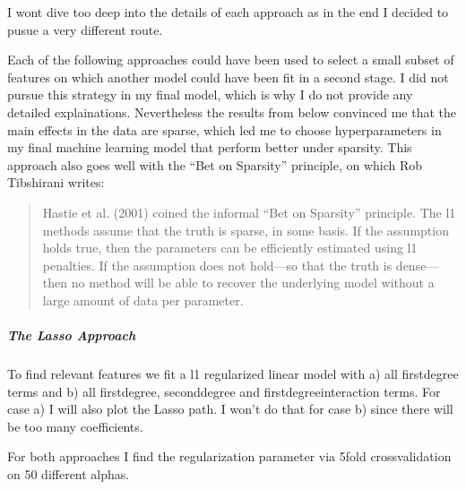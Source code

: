 \documentclass[letterpaper,10pt,english]{sphinxmanual}
\begin{document}
I wont dive too deep into the details of each approach as in the end I decided to pusue a very different route.

Each of the following approaches could have been used to select a small subset of features on which another model could have been fit in a second stage. I did not pursue this strategy in my final model, which is why I do not provide any detailed explainations. Nevertheless the results from below convinced me that the main effects in the data are sparse, which led me to choose hyperparameters in my final machine learning model that perform better under sparsity. This approach also goes well with the “Bet on Sparsity” principle, on which Rob Tibshirani writes:
\begin{quote}

Hastie et al. (2001) coined the informal “Bet on Sparsity” principle. The l1 methods assume that the truth is sparse, in some basis. If the assumption holds true, then the parameters can be efficiently estimated using l1 penalties. If the assumption does not hold—so that the truth is dense—then no method will be able to recover the underlying model without a large amount of data per parameter.
\end{quote}


\subparagraph{The Lasso Approach}
\label{\detokenize{simulated_reverse_engineering:the-lasso-approach}}
To find relevant features we fit a l1 regularized linear model with a) all first\sphinxhyphen{}degree terms and b) all first\sphinxhyphen{}degree, second\sphinxhyphen{}degree and first\sphinxhyphen{}degree\sphinxhyphen{}interaction terms. For case a) I will also plot the Lasso path. I won’t do that for case b) since there will be too many coefficients.

For both approaches I find the  regularization parameter via 5\sphinxhyphen{}fold cross\sphinxhyphen{}validation on 50 different alphas.


\begin{sphinxVerbatim}[commandchars=\\\{\}]
    
   

  \PYG{p}{[}  \PYG{p}{]}
 
\end{sphinxVerbatim}
\end{document}

